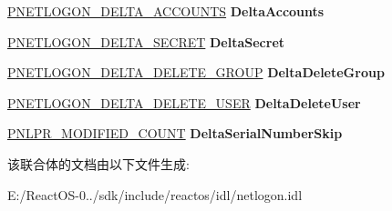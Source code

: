 \begin{DoxyCompactItemize}
\item 
\mbox{\label{union___n_e_t_l_o_g_o_n___d_e_l_t_a___u_n_i_o_n_a9b0871469a61392b4436996b75bc1ea2}} 
\hyperlink{struct___n_e_t_l_o_g_o_n___d_e_l_t_a___a_c_c_o_u_n_t_s}{P\+N\+E\+T\+L\+O\+G\+O\+N\+\_\+\+D\+E\+L\+T\+A\+\_\+\+A\+C\+C\+O\+U\+N\+TS} {\bfseries Delta\+Accounts}
\item 
\mbox{\label{union___n_e_t_l_o_g_o_n___d_e_l_t_a___u_n_i_o_n_a8db3810514da86d4d0610a7f1fd21f4d}} 
\hyperlink{struct___n_e_t_l_o_g_o_n___d_e_l_t_a___s_e_c_r_e_t}{P\+N\+E\+T\+L\+O\+G\+O\+N\+\_\+\+D\+E\+L\+T\+A\+\_\+\+S\+E\+C\+R\+ET} {\bfseries Delta\+Secret}
\item 
\mbox{\label{union___n_e_t_l_o_g_o_n___d_e_l_t_a___u_n_i_o_n_af04b73af79309759482e77a4ffcd8df7}} 
\hyperlink{struct___n_e_t_l_o_g_o_n___d_e_l_t_a___d_e_l_e_t_e___g_r_o_u_p}{P\+N\+E\+T\+L\+O\+G\+O\+N\+\_\+\+D\+E\+L\+T\+A\+\_\+\+D\+E\+L\+E\+T\+E\+\_\+\+G\+R\+O\+UP} {\bfseries Delta\+Delete\+Group}
\item 
\mbox{\label{union___n_e_t_l_o_g_o_n___d_e_l_t_a___u_n_i_o_n_acc435cfd7b260a3a749f5f4a72930bc3}} 
\hyperlink{struct___n_e_t_l_o_g_o_n___d_e_l_t_a___d_e_l_e_t_e___u_s_e_r}{P\+N\+E\+T\+L\+O\+G\+O\+N\+\_\+\+D\+E\+L\+T\+A\+\_\+\+D\+E\+L\+E\+T\+E\+\_\+\+U\+S\+ER} {\bfseries Delta\+Delete\+User}
\item 
\mbox{\label{union___n_e_t_l_o_g_o_n___d_e_l_t_a___u_n_i_o_n_a75ddf01bee041bde929bfd96bc891fd6}} 
\hyperlink{struct___n_l_p_r___m_o_d_i_f_i_e_d___c_o_u_n_t}{P\+N\+L\+P\+R\+\_\+\+M\+O\+D\+I\+F\+I\+E\+D\+\_\+\+C\+O\+U\+NT} {\bfseries Delta\+Serial\+Number\+Skip}
\end{DoxyCompactItemize}


该联合体的文档由以下文件生成\+:\begin{DoxyCompactItemize}
\item 
E\+:/\+React\+O\+S-\/0../sdk/include/reactos/idl/netlogon.\+idl\end{DoxyCompactItemize}
